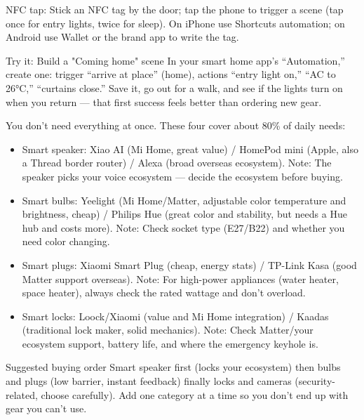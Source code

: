NFC tap: Stick an NFC tag by the door; tap the phone to trigger a scene (tap once for entry lights, twice for sleep). On iPhone use Shortcuts automation; on Android use Wallet or the brand app to write the tag.

\begin{tcbpractice}{Try it: Build a "Coming home" scene}
In your smart home app's “Automation,” create one: trigger “arrive at place” (home), actions “entry light on,” “AC to 26°C,” “curtains close.” Save it, go out for a walk, and see if the lights turn on when you return — that first success feels better than ordering new gear.

\end{tcbpractice}


You don't need everything at once. These four cover about 80\% of daily needs:

\begin{itemize}
  \item Smart speaker: Xiao AI (Mi Home, great value) / HomePod mini (Apple, also a Thread border router) / Alexa (broad overseas ecosystem). Note: The speaker picks your voice ecosystem — decide the ecosystem before buying.
  \item Smart bulbs: Yeelight (Mi Home/Matter, adjustable color temperature and brightness, cheap) / Philips Hue (great color and stability, but needs a Hue hub and costs more). Note: Check socket type (E27/B22) and whether you need color changing.
  \item Smart plugs: Xiaomi Smart Plug (cheap, energy stats) / TP-Link Kasa (good Matter support overseas). Note: For high-power appliances (water heater, space heater), always check the rated wattage and don't overload.
  \item Smart locks: Loock/Xiaomi (value and Mi Home integration) / Kaadas (traditional lock maker, solid mechanics). Note: Check Matter/your ecosystem support, battery life, and where the emergency keyhole is.
\end{itemize}

\begin{tcbinfo}{Suggested buying order}
Smart speaker first (locks your ecosystem) then bulbs and plugs (low barrier, instant feedback) finally locks and cameras (security-related, choose carefully). Add one category at a time so you don't end up with gear you can't use.

\end{tcbinfo}

